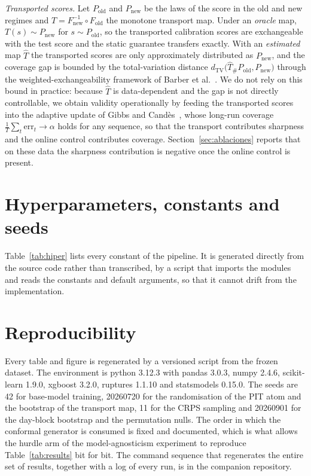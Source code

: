 \documentclass[preprint,3p,times]{elsarticle}
\begin{document}
\emph{Transported scores.} Let $P_{\mathrm{old}}$ and $P_{\mathrm{new}}$ be the laws of the score in the old and new regimes and $T=F_{\mathrm{new}}^{-1}\circ F_{\mathrm{old}}$ the monotone transport map. Under an \emph{oracle} map, $T(s)\sim P_{\mathrm{new}}$ for $s\sim P_{\mathrm{old}}$, so the transported calibration scores are exchangeable with the test score and the static guarantee transfers exactly. With an \emph{estimated} map $\hat T$ the transported scores are only approximately distributed as $P_{\mathrm{new}}$, and the coverage gap is bounded by the total-variation distance $d_{\mathrm{TV}}\big(\hat T_\# P_{\mathrm{old}},P_{\mathrm{new}}\big)$ through the weighted-exchangeability framework of Barber et al.~\cite{barber2023}. We do not rely on this bound in practice: because $\hat T$ is data-dependent and the gap is not directly controllable, we obtain validity operationally by feeding the transported scores into the adaptive update of Gibbs and Cand\`es~\cite{gibbs2021}, whose long-run coverage $\frac1T\sum_t\mathrm{err}_t\to\alpha$ holds for any sequence, so that the transport contributes sharpness and the online control contributes coverage. Section~\ref{sec:ablaciones} reports that on these data the sharpness contribution is negative once the online control is present.

\section{Hyperparameters, constants and seeds}
\label{app:hiper}

Table~\ref{tab:hiper} lists every constant of the pipeline. It is generated directly from the source code rather than transcribed, by a script that imports the modules and reads the constants and default arguments, so that it cannot drift from the implementation.



\section{Reproducibility}
\label{app:repro}

Every table and figure is regenerated by a versioned script from the frozen dataset. The environment is python 3.12.3 with pandas 3.0.3, numpy 2.4.6, scikit-learn 1.9.0, xgboost 3.2.0, ruptures 1.1.10 and statsmodels 0.15.0. The seeds are 42 for base-model training, 20260720 for the randomisation of the PIT atom and the bootstrap of the transport map, 11 for the CRPS sampling and 20260901 for the day-block bootstrap and the permutation nulls. The order in which the conformal generator is consumed is fixed and documented, which is what allows the hurdle arm of the model-agnosticism experiment to reproduce Table~\ref{tab:results} bit for bit. The command sequence that regenerates the entire set of results, together with a log of every run, is in the companion repository.
\end{document}

